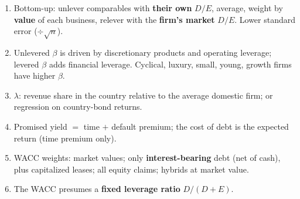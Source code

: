 \begin{trapbox}
\begin{enumerate}[leftmargin=*]
  \item Bottom-up: unlever comparables with \textbf{their own} $D/E$, average, weight by \textbf{value} of each business, relever with the \textbf{firm's market} $D/E$. Lower standard error ($\div\sqrt{n}$).
  \item Unlevered $\beta$ is driven by discretionary products and operating leverage; levered $\beta$ adds financial leverage. Cyclical, luxury, small, young, growth firms have higher $\beta$.
  \item $\lambda$: revenue share in the country relative to the average domestic firm; or regression on country-bond returns.
  \item Promised yield $=$ time $+$ default premium; the cost of debt is the expected return (time premium only).
  \item WACC weights: market values; only \textbf{interest-bearing} debt (net of cash), plus capitalized leases; all equity claims; hybrids at market value.
  \item The WACC presumes a \textbf{fixed leverage ratio} $D/(D+E)$.
\end{enumerate}
\end{trapbox}
